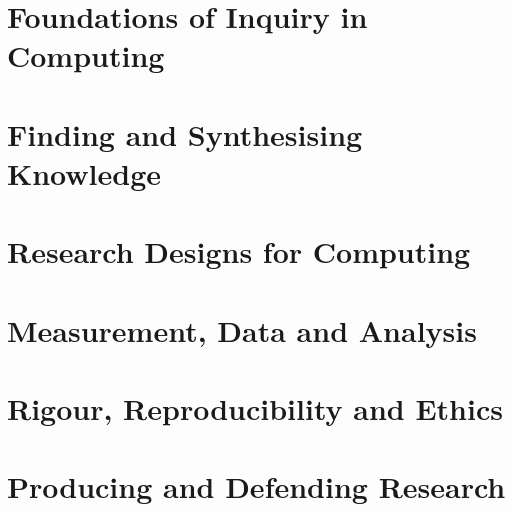 \documentclass[11pt,a4paper,oneside]{report}
\begin{document}


\part{Foundations of Inquiry in Computing}






\part{Finding and Synthesising Knowledge}






\part{Research Designs for Computing}










\part{Measurement, Data and Analysis}










\part{Rigour, Reproducibility and Ethics}







\part{Producing and Defending Research}





\end{document}
